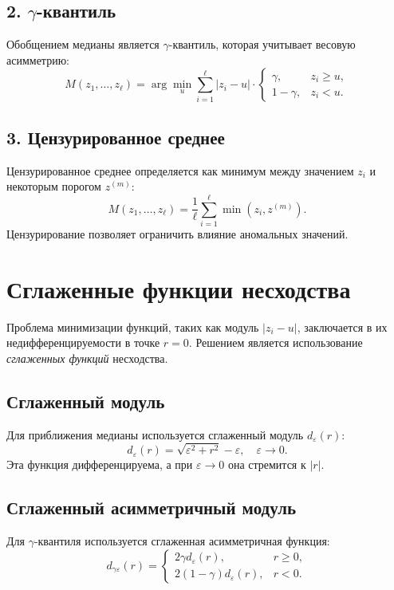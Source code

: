 \subsection*{2. $\gamma$-квантиль}
Обобщением медианы является $\gamma$-квантиль, которая учитывает весовую асимметрию:
\begin{equation}
    M(z_1, \dots, z_\ell) = \arg \min_u \sum_{i=1}^\ell |z_i - u| \cdot \begin{cases}
        \gamma, & z_i \geq u, \\
        1 - \gamma, & z_i < u.
    \end{cases}
\end{equation}

\subsection*{3. Цензурированное среднее}
Цензурированное среднее определяется как минимум между значением $z_i$ и некоторым порогом $z^{(m)}$:
\begin{equation}
    M(z_1, \dots, z_\ell) = \frac{1}{\ell} \sum_{i=1}^\ell \min(z_i, z^{(m)}).
\end{equation}
Цензурирование позволяет ограничить влияние аномальных значений.

\section*{Сглаженные функции несходства}
Проблема минимизации функций, таких как модуль $|z_i - u|$, заключается в их недифференцируемости в точке $r = 0$. Решением является использование \textit{сглаженных функций} несходства.

\subsection*{Сглаженный модуль}
Для приближения медианы используется сглаженный модуль $d_\varepsilon(r)$:
\begin{equation}
    d_\varepsilon(r) = \sqrt{\varepsilon^2 + r^2} - \varepsilon, \quad \varepsilon \to 0.
\end{equation}
Эта функция дифференцируема, а при $\varepsilon \to 0$ она стремится к $|r|$.

\subsection*{Сглаженный асимметричный модуль}
Для $\gamma$-квантиля используется сглаженная асимметричная функция:
\begin{equation}
    d_{\gamma\varepsilon}(r) = \begin{cases}
        2\gamma d_\varepsilon(r), & r \geq 0, \\
        2(1 - \gamma) d_\varepsilon(r), & r < 0.
    \end{cases}
\end{equation}

